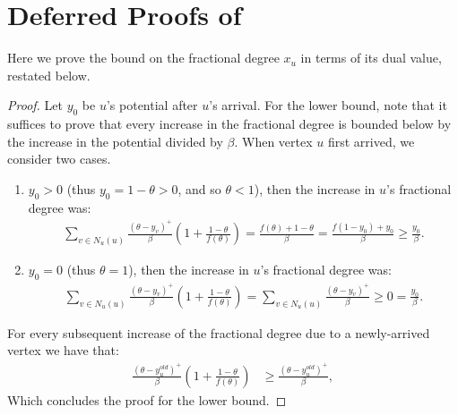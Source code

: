 \section{Deferred Proofs of \texorpdfstring{}{Algorithm 1}}\label{app:fractional-algo}
Here we prove the bound on the fractional degree $x_u$ in terms of its dual value, restated below.
\begin{proof}
	Let $y_0$ be $u$'s potential after $u$'s arrival. For the lower bound, note that it suffices to prove that every increase in the fractional degree is bounded below by the increase in the potential divided by $\beta$. When vertex $u$ first arrived, we consider two cases.
	
	\begin{enumerate}
		
		\item  $y_0  > 0$ (thus $y_0 = 1 - \theta > 0$, and so $\theta< 1$), then  the increase in $u$'s fractional degree was:
		\begin{align*}
		\sum_{v \in N_u(u)} \frac{(\theta - y_v)^{+}}{\beta} \left(1 + \frac{1-\theta}{f(\theta)}\right) =  \frac{f(\theta) + 1 - \theta}{\beta} = \frac{f(1-y_0) + y_0}{\beta} \geq \frac{y_0}{\beta}.
		\end{align*}
		
		\item  $y_0 = 0$ (thus $\theta = 1$), then the increase in $u$'s fractional degree was:
		\begin{align*}	
		\sum_{v \in N_u(u)} \frac{(\theta - y_v)^{+}}{\beta} \left(1 + \frac{1-\theta}{f(\theta)}\right) =  \sum_{v \in N_u(u)} \frac{(\theta - y_v)^{+}}{\beta}  \geq  0 = \frac{y_0}{\beta}.
		\end{align*}
		
	\end{enumerate}
	For every subsequent increase of the fractional degree due to a newly-arrived vertex we have that:
	\begin{align*}
	\frac{(\theta - y_u^{old})^+}{\beta} \left(1 + \frac{1-\theta}{f(\theta)}\right) & \geq \frac{(\theta - y_u^{old})^+}{\beta},
	\end{align*}
	Which concludes the proof for the lower bound.
	

\end{proof}
